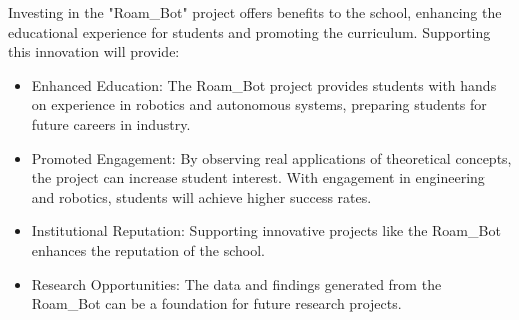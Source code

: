 Investing in the "Roam\_Bot" project offers benefits to the school, enhancing the educational experience for students and promoting the curriculum. Supporting this innovation will provide:

\begin{itemize}
  \item Enhanced Education: The Roam\_Bot project provides students with hands on experience in robotics and autonomous systems, preparing students for future careers in industry. 
  \item Promoted Engagement: By observing real applications of theoretical concepts, the project can increase student interest. With engagement in engineering and robotics, students will achieve higher success rates.
  \item Institutional Reputation: Supporting innovative projects like the Roam\_Bot enhances the reputation of the school.
  \item Research Opportunities: The data and findings generated from the Roam\_Bot can be a foundation for future research projects.
\end{itemize}
\newpage



